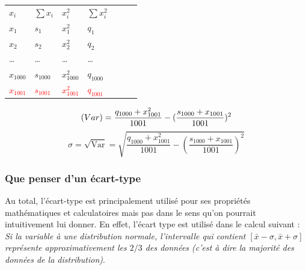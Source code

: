 \begin{center}
\begin{tabular}{lllllll}
\cline{1-4}
\multicolumn{1}{|l|}{$x_{i}$} & \multicolumn{1}{l|}{$\sum x_{i}$} & \multicolumn{1}{l|}{$x_{i}^{2}$} & \multicolumn{1}{l|}{$\sum x_{i}^{2}$} &  &  &  \\ \cline{1-4}
$x_{1}$                       & $s_{1}$                           & $x_{1}^{2}$                      & $q_{1}$                               &  &  &  \\
$x_{2}$                       & $s_{2}$                           & $x_{2}^{2}$                      & $q_{2}$                               &  &  &  \\
\dots                         & \dots                             & \dots                            & \dots                                 &  &  &  \\
$x_{1000}$                    & $s_{1000}$                        & $x_{1000}^{2}$                   & $q_{1000}$                            &  &  &  \\
\textcolor{red}{$x_{1001}$}                    & \textcolor{red}{$s_{1001}$ }                      & \textcolor{red}{$x_{1001}^{2}$}                  & \textcolor{red}{$q_{1001}$}                          &  &  &
\end{tabular}
\end{center}

$$\textrm(Var) = \frac{q_{1000}+x_{1001}^{2}}{1001} - (\frac{s_{1000}+x_{1001}}{1001})^{2}$$
$$\sigma = \sqrt{\textrm{Var}} = \sqrt{\frac{q_{1000}+x_{1001}^{2}}{1001} - (\frac{s_{1000}+x_{1001}}{1001})^{2}}$$
\subsubsection{Que penser d'un écart-type}
Au total, l'écart-type est principalement utilisé pour ses propriétés mathématiques et calculatoires mais pas dans le sens qu'on pourrait intuitivement lui donner.\newline
En effet, l'écart type est utilisé dans le calcul suivant :\newline
\\
\textit{Si la variable à une distribution normale, l'intervalle qui contient $[\bar{x}-\sigma, \bar{x}+\sigma]$ représente approximativement les $2/3$ des données (c'est à dire la majorité des données de la distribution)}.\newline
\newpage
